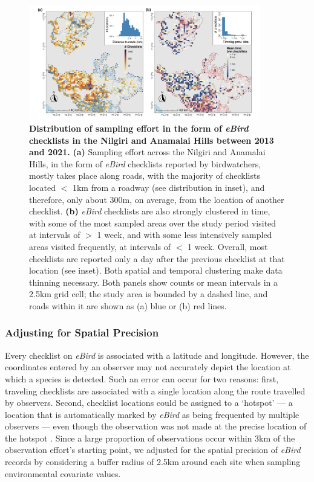 \begin{figure}[h!]
    \centering
    \includegraphics[width=0.9\textwidth]{figures/hillybirds/fig_03.png}
    \caption{
        \textbf{Distribution of sampling effort in the form of \textit{eBird} checklists in the Nilgiri and Anamalai Hills between 2013 and 2021.}
        \textbf{(a)} Sampling effort across the Nilgiri and Anamalai Hills, in the form of \textit{eBird} checklists reported by birdwatchers, mostly takes place along roads, with the majority of checklists located $<$ 1km from a roadway (see distribution in inset), and therefore, only about 300m, on average, from the location of another checklist.
        \textbf{(b)} \textit{eBird} checklists are also strongly clustered in time, with some of the most sampled areas over the study period visited at intervals of $>$ 1 week, and with some less intensively sampled areas visited frequently, at intervals of $<$ 1 week.
        Overall, most checklists are reported only a day after the previous checklist at that location (see inset).
        Both spatial and temporal clustering make data thinning necessary.
        Both panels show counts or mean intervals in a 2.5km grid cell; the study area is bounded by a dashed line, and roads within it are shown as (a) blue or (b) red lines.
    }
    \label{hilly_fig_03}
\end{figure}

\subsubsection*{Adjusting for Spatial Precision}

Every checklist on \textit{eBird} is associated with a latitude and longitude.
However, the coordinates entered by an observer may not accurately depict the location at which a species is detected.
Such an error can occur for two reasons: first, traveling checklists are associated with a single location along the route travelled by observers.
Second, checklist locations could be assigned to a `hotspot' --- a location that is automatically marked by \textit{eBird} as being frequented by multiple observers --- even though the observation was not made at the precise location of the hotspot \citep{praveenj.2017}.
Since a large proportion of observations occur within 3km of the observation effort's starting point, we adjusted for the spatial precision of \textit{eBird} records by considering a buffer radius of 2.5km around each site when sampling environmental covariate values.

